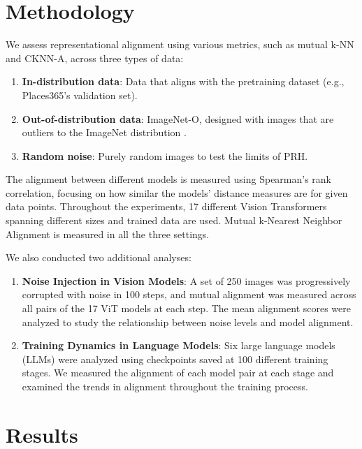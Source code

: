 \documentclass[10pt,a4paper]{article}
\begin{document}
\section{Methodology}
We assess representational alignment using various metrics, such as mutual k-NN and CKNN-A, across three types of data:
\begin{enumerate}
    \item \textbf{In-distribution data}: Data that aligns with the pretraining dataset (e.g., Places365’s validation set).
    \item \textbf{Out-of-distribution data}: ImageNet-O, designed with images that are outliers to the ImageNet distribution \cite{hendrycks2021nae}.
    \item \textbf{Random noise}: Purely random images to test the limits of PRH.
\end{enumerate}
The alignment between different models is measured using Spearman's rank correlation, focusing on how similar the models' distance measures are for given data points. Throughout the experiments, 17 different Vision Transformers spanning different sizes and trained data are used. Mutual k-Nearest Neighbor Alignment is measured in all the three settings.

We also conducted two additional analyses:
\begin{enumerate}
    \item \textbf{Noise Injection in Vision Models}: A set of 250 images was progressively corrupted with noise in 100 steps, and mutual alignment was measured across all pairs of the 17 ViT models at each step. The mean alignment scores were analyzed to study the relationship between noise levels and model alignment.
    \item \textbf{Training Dynamics in Language Models}: Six large language models (LLMs) were analyzed using checkpoints saved at 100 different training stages. We measured the alignment of each model pair at each stage and examined the trends in alignment throughout the training process.
\end{enumerate}

\section{Results}
\end{document}

